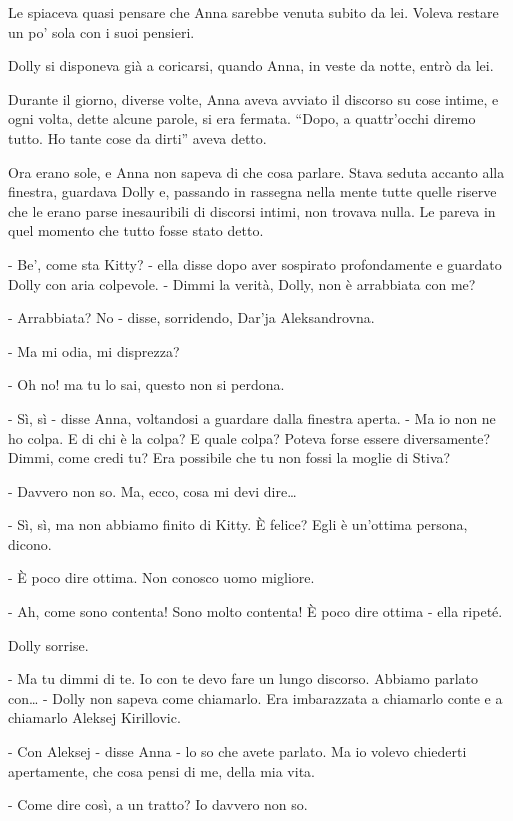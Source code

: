 Le spiaceva quasi pensare che Anna sarebbe venuta subito da lei. Voleva restare un po' sola con i suoi pensieri. 

\label{xxiii-5} 

Dolly si disponeva già a coricarsi, quando Anna, in veste da notte, entrò da lei. 

Durante il giorno, diverse volte, Anna aveva avviato il discorso su cose intime, e ogni volta, dette alcune parole, si era fermata. ``Dopo, a quattr'occhi diremo tutto. Ho tante cose da dirti'' aveva detto. 

Ora erano sole, e Anna non sapeva di che cosa parlare. Stava seduta accanto alla finestra, guardava Dolly e, passando in rassegna nella mente tutte quelle riserve che le erano parse inesauribili di discorsi intimi, non trovava nulla. Le pareva in quel momento che tutto fosse stato detto. 

- Be', come sta Kitty? - ella disse dopo aver sospirato profondamente e guardato Dolly con aria colpevole. - Dimmi la verità, Dolly, non è arrabbiata con me? 

- Arrabbiata? No - disse, sorridendo, Dar'ja Aleksandrovna. 

- Ma mi odia, mi disprezza? 

- Oh no! ma tu lo sai, questo non si perdona. 

- Sì, sì - disse Anna, voltandosi a guardare dalla finestra aperta. - Ma io non ne ho colpa. E di chi è la colpa? E quale colpa? Poteva forse essere diversamente? Dimmi, come credi tu? Era possibile che tu non fossi la moglie di Stiva? 

- Davvero non so. Ma, ecco, cosa mi devi dire\ldots{} 

- Sì, sì, ma non abbiamo finito di Kitty. È felice? Egli è un'ottima persona, dicono. 

- È poco dire ottima. Non conosco uomo migliore. 

- Ah, come sono contenta! Sono molto contenta! È poco dire ottima - ella ripeté. 

Dolly sorrise. 

- Ma tu dimmi di te. Io con te devo fare un lungo discorso. Abbiamo parlato con\ldots{} - Dolly non sapeva come chiamarlo. Era imbarazzata a chiamarlo conte e a chiamarlo Aleksej Kirillovic. 

- Con Aleksej - disse Anna - lo so che avete parlato. Ma io volevo chiederti apertamente, che cosa pensi di me, della mia vita. 

- Come dire così, a un tratto? Io davvero non so. 

